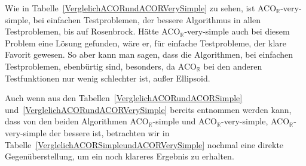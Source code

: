 \documentclass[fontsize=12, a4aper]{scrartcl}
\begin{document}
	Wie in Tabelle~\ref{VerglelichACORundACORVerySimple} zu sehen, ist ACO\(_{\mathbb{R}}\)-very-simple, bei einfachen Testproblemen, der bessere Algorithmus in allen Testproblemen, bis auf \glqq Rosenbrock\grqq. Hätte ACO\(_{\mathbb{R}}\)-very-simple auch bei diesem Problem eine Lösung gefunden, wäre er, für einfache Testprobleme, der klare Favorit gewesen. So aber kann man sagen, dass die Algorithmen, bei einfachen Testproblemen, ebenbürtig sind, besonders, da ACO\(_{\mathbb{R}}\) bei den anderen Testfunktionen nur wenig schlechter ist, außer \glqq Ellipsoid\grqq.\hfill\newline
	
	Auch wenn aus den Tabellen~\ref{VerglelichACORundACORSimple} und~\ref{VerglelichACORundACORVerySimple} bereits entnommen werden kann, dass von den beiden Algorithmen ACO\(_{\mathbb{R}}\)-simple und ACO\(_{\mathbb{R}}\)-very-simple, ACO\(_{\mathbb{R}}\)-very-simple der bessere ist, betrachten wir in Tabelle~\ref{VerglelichACORSimpleundACORVerySimple} nochmal eine direkte Gegenüberstellung, um ein noch klareres Ergebnis zu erhalten.
	
\end{document}
